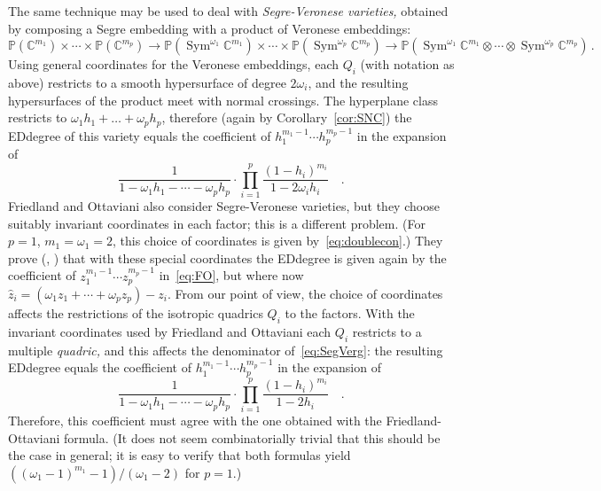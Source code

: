 \documentclass[11pt]{amsart}
\numberwithin{equation}{section}
\newcommand{\Cbb}{{\mathbb{C}}}
\newcommand{\Pbb}{{\mathbb{P}}}
\DeclareMathOperator{\Sym}{Sym}
\begin{document}
The same technique may be used to deal with {\em Segre-Veronese varieties,\/}
obtained by composing a Segre embedding with a product of Veronese embeddings:
{\small
\[
\Pbb(\Cbb^{m_1})\times\cdots\times \Pbb(\Cbb^{m_p})
\to \Pbb(\Sym^{\omega_1}\Cbb^{m_1}) \times \cdots \times \Pbb(\Sym^{\omega_p}\Cbb^{m_p})
\to \Pbb(\Sym^{\omega_1}\Cbb^{m_1}\otimes \cdots \otimes \Sym^{\omega_p}\Cbb^{m_p})\,.
\]}
Using general coordinates for the Veronese embeddings, each $Q_i$ (with notation as above)
restricts to a smooth hypersurface of degree $2\omega_i$, and the resulting hypersurfaces of the
product meet with normal crossings. The hyperplane class restricts to $\omega_1 h_1 +
\dots + \omega_p h_p$, therefore (again by Corollary~\ref{cor:SNC})
the EDdegree of this variety equals the coefficient of 
$h_1^{m_1-1}\cdots h_p^{m_p-1}$ in the expansion of
\begin{equation}\label{eq:SegVerg}
\frac 1{1-\omega_1 h_1-\cdots -\omega_p h_p}\cdot \prod_{i=1}^p 
\frac{(1-h_i)^{m_i}}{1-2\omega_i h_i}\quad.
\end{equation}
Friedland and Ottaviani also consider Segre-Veronese varieties, but they choose 
suitably invariant coordinates in each factor; this is a different problem. 
(For $p=1$, $m_1=\omega_1=2$, this choice of coordinates is given 
by~\eqref{eq:doublecon}.) They
prove (\cite{MR3273677}, \cite[Theorem~8.6]{MR3451425}) that with these
special coordinates the EDdegree is given again by the coefficient 
of $z_1^{m_1-1}\cdots z_p^{m_p-1}$ in~\eqref{eq:FO}, but where now 
$\hat z_i = (\omega_1 z_1+\cdots + \omega_p z_p)-z_i$.
From our point of view, the choice of coordinates affects the restrictions of the
isotropic quadrics $Q_i$ to the factors. With the invariant coordinates used by
Friedland and Ottaviani each $Q_i$ restricts to a multiple {\em quadric,\/} and
this affects the denominator of~\eqref{eq:SegVerg}: the resulting 
EDdegree equals the coefficient of $h_1^{m_1-1}\cdots h_p^{m_p-1}$ in the 
expansion of
\begin{equation}\label{eq:SegreVer}
\frac 1{1-\omega_1 h_1-\cdots -\omega_p h_p}\cdot \prod_{i=1}^p 
\frac{(1-h_i)^{m_i}}{1-2 h_i}\quad.
\end{equation}
Therefore, this coefficient must agree with the one obtained with the 
Friedland-Ottaviani formula.
(It does not seem combinatorially trivial that this should be the case in general; 
it is easy to verify that both formulas yield $((\omega_1-1)^{m_1}-1)/(\omega_1-2)$ 
for $p=1$.)




\end{document}
